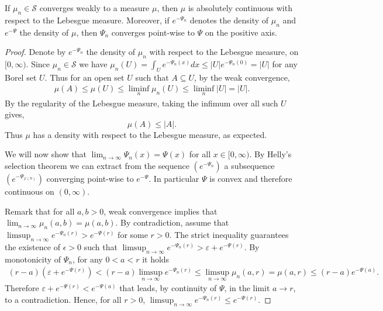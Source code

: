 \documentclass[10pt,a4paper]{amsart}
\begin{document}
\begin{lemma}\label{lem:absolutely-continuous}
If $\mu_{n}\in\mathcal{S}$ converges weakly to a measure $\mu$,  then $\mu$ is absolutely continuous with respect to the Lebesgue measure. Moreover, if $e^{-\Psi_n}$ denotes the density of $\mu_n$ and $e^{-\Psi}$ the density of $\mu$, then $\Psi_n$ converges point-wise to $\Psi$ on the positive axis.
\end{lemma}

\begin{proof}
Denote by $e^{-\Psi_n}$ the density of $\mu_n$ with respect to the Lebesgue measure,
on $[0,\infty)$. Since $\mu_n \in \mathcal{S}$ we have $\mu_n(U) = \int_U e^{-\Psi_n(x)} dx \leq |U| e^{- \Psi_n(0)} = |U|$ for any Borel set $U$.  Thus for an open set $U$ such that $A \subseteq U$, by the weak convergence,
\begin{align*}
    \mu(A) \leq \mu(U) \leq \liminf_n \mu_n(U) \leq \liminf_n |U| = |U|.
\end{align*}
By the regularity of the Lebesgue measure, taking the infimum over all such $U$ gives,
\[
    \mu(A) \leq |A|.
\]
Thus $\mu$ has a density with respect to the Lebesgue measure, as expected. 

We will now show that $\lim_{n\rightarrow\infty}\Psi_{n}(x)=\Psi(x)$ for all $x \in [0,\infty)$.
By Helly's selection theorem we can extract from the sequence $(e^{-\Psi_n})$ a subsequence $(e^{-\Psi_{\varphi(n)}})$ converging point-wise to $e^{-\Psi}$.
In particular $\Psi$ is convex and therefore continuous on $(0,\infty)$.  



Remark that for all $a,b>0$, weak convergence implies that $\lim_{n\rightarrow\infty}\mu_{n}(a,b)=\mu(a,b)$. By contradiction, assume that $\limsup_{n\rightarrow\infty}e^{-\Psi_{n}(r)}>e^{-\Psi(r)}$ for some $r > 0$. 
The strict inequality guarantees  the existence of $\epsilon>0$ such that $\limsup_{n\rightarrow\infty}e^{-\Psi_{n}(r)} > \varepsilon + e^{-\Psi(r)}$. By monotonicity of $\Psi_n$, for any $0<a<r$ it holds
     \begin{align*}
      (r-a)(\varepsilon + e^{-\Psi(r)})
      < (r-a) \limsup_{n\rightarrow\infty} e^{-\Psi_n(r)} 
      \leq 
      \limsup_{n\rightarrow\infty}\mu_{n}(a,r)
      =\mu(a,r) 
      \leq (r-a)e^{-\Psi(a)} .
      \end{align*} 
      Therefore $\varepsilon + e^{-\Psi(r)} < e^{-\Psi(a)}$ that leads, by continuity of $\Psi$, in the limit $a \to r$, to a contradiction. Hence,  for all $r >0$, $\limsup_{n\rightarrow\infty}e^{-\Psi_{n}(r)} \leq e^{-\Psi(r)}$.
     

\end{proof}
\end{document}
